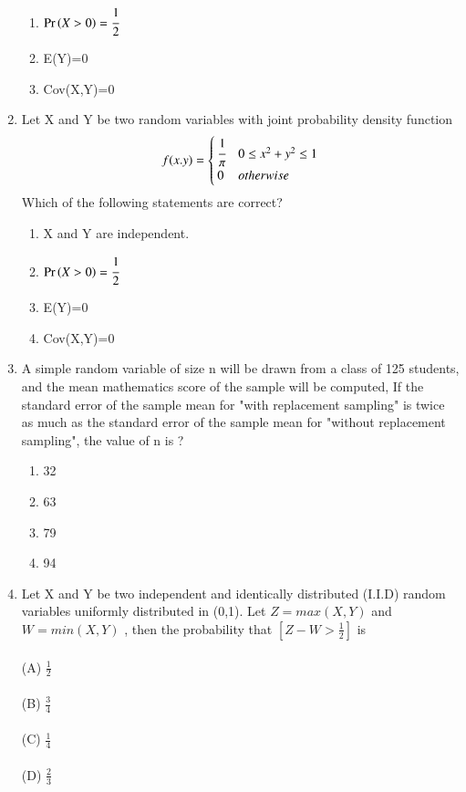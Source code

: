 \begin{enumerate}[label=\thesection.\arabic*.,ref=\thesection.\theenumi]
\begin{enumerate}
    \item
    $\Pr\left(X>0\right)=\cfrac{1}{2}$
    
    \item
    E(Y)=0
    
    \item
    Cov(X,Y)=0
\end{enumerate}
%
%
\solution
%
%
\item Let X and Y be two random variables with joint probability density function
\begin{align*}
    f(x.y)=
    \begin{cases}
    \cfrac{1}{\pi} & 0\le x^2 + y^2 \le 1\\
    0 & otherwise
    \end{cases}
\end{align*}
Which of the following statements are correct?
\begin{enumerate}
    \item
    X and Y are independent.
    
    \item
    $\Pr\left(X>0\right)=\cfrac{1}{2}$
    
    \item
    E(Y)=0
    
    \item
    Cov(X,Y)=0
\end{enumerate}
%
%
\solution

%
\item A simple random variable of size n will be drawn from a class of 125 students, and the mean mathematics score of the sample will be computed, If the standard error of the sample mean for "with replacement sampling" is twice as much as the standard error of the sample mean for "without replacement sampling", the value of n is ? 
	\begin{enumerate}
	\item 32
	\item 63
	\item 79
	\item 94
	\end{enumerate}
%
\solution



\item Let X and Y be two independent and identically distributed (I.I.D) random variables uniformly distributed in (0,1). Let $Z = max(X,Y)$ and $W = min(X,Y)$ , then the probability that $[Z-W >\frac{1}{2}]$ is\\
\\(A) $\frac{1}{2}$\\
\\(B) $\frac{3}{4}$\\
\\(C) $\frac{1}{4}$\\
\\(D) $\frac{2}{3}$    
%
\solution




\end{enumerate}
